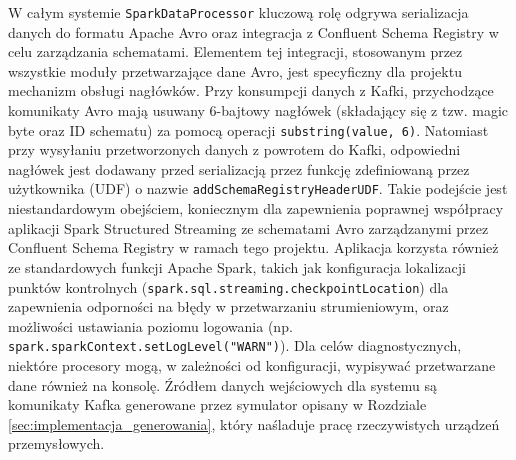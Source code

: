 W całym systemie \texttt{SparkDataProcessor} kluczową rolę odgrywa serializacja danych do formatu Apache Avro oraz integracja z Confluent Schema Registry w celu zarządzania schematami. Elementem tej integracji, stosowanym przez wszystkie moduły przetwarzające dane Avro, jest specyficzny dla projektu mechanizm obsługi nagłówków. Przy konsumpcji danych z Kafki, przychodzące komunikaty Avro mają usuwany 6-bajtowy nagłówek (składający się z tzw. magic byte oraz ID schematu) za pomocą operacji \texttt{substring(value, 6)}. Natomiast przy wysyłaniu przetworzonych danych z powrotem do Kafki, odpowiedni nagłówek jest dodawany przed serializacją przez funkcję zdefiniowaną przez użytkownika (UDF) o nazwie \texttt{addSchemaRegistryHeaderUDF}. Takie podejście jest niestandardowym obejściem, koniecznym dla zapewnienia poprawnej współpracy aplikacji Spark Structured Streaming ze schematami Avro zarządzanymi przez Confluent Schema Registry w ramach tego projektu. Aplikacja korzysta również ze standardowych funkcji Apache Spark, takich jak konfiguracja lokalizacji punktów kontrolnych (\texttt{spark.sql.streaming.checkpointLocation}) dla zapewnienia odporności na błędy w przetwarzaniu strumieniowym, oraz możliwości ustawiania poziomu logowania (np. \texttt{spark.sparkContext.setLogLevel("WARN")}). Dla celów diagnostycznych, niektóre procesory mogą, w zależności od konfiguracji, wypisywać przetwarzane dane również na konsolę. Źródłem danych wejściowych dla systemu są komunikaty Kafka generowane przez symulator opisany w Rozdziale \ref{sec:implementacja_generowania}, który naśladuje pracę rzeczywistych urządzeń przemysłowych.

